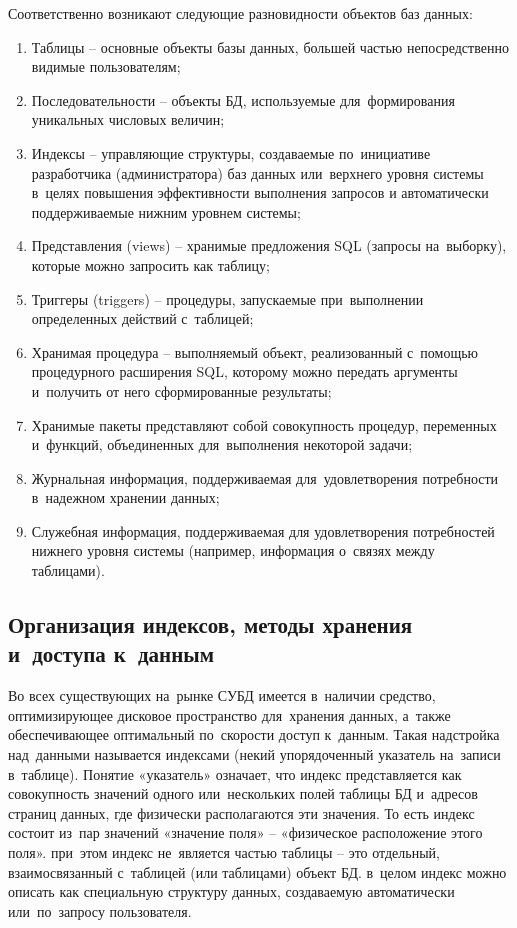 \documentclass{ou}
\begin{document}
Соответственно возникают следующие разновидности объектов баз данных:
\begin{enumerate}[itemindent=4em, nosep, label=\arabic*)]
\item Таблицы -- основные объекты базы данных, большей частью непосредственно видимые пользователям;
\item Последовательности -- объекты БД, используемые для~формирования уникальных числовых величин;
\item Индексы -- управляющие структуры, создаваемые по~инициативе разработчика (администратора) баз данных или~верхнего уровня системы в~целях повышения эффективности выполнения запросов и автоматически поддерживаемые нижним уровнем системы;
\item Представления (views) -- хранимые предложения SQL (запросы на~выборку), которые можно запросить как таблицу;
\item Триггеры (triggers) -- процедуры, запускаемые при~выполнении определенных действий с~таблицей;
\item Хранимая процедура -- выполняемый объект, реализованный с~помощью процедурного расширения SQL, которому можно передать аргументы и~получить от него сформированные результаты;
\item Хранимые пакеты представляют собой совокупность процедур, переменных и~функций, объединенных для~выполнения некоторой задачи;
\item Журнальная информация, поддерживаемая для~удовлетворения потребности в~надежном хранении данных;
\item Служебная информация, поддерживаемая для удовлетворения потребностей нижнего уровня системы (например, информация о~связях между таблицами).
\end{enumerate}
\subsection{Организация индексов, методы хранения и~доступа к~данным}
Во всех существующих на~рынке СУБД имеется в~наличии средство, оптимизирующее дисковое пространство для~хранения данных, а~также обеспечивающее оптимальный по~скорости доступ к~данным. Такая надстройка над~данными называется индексами (некий упорядоченный указатель на~записи в~таблице). Понятие «указатель» означает, что индекс представляется как совокупность значений одного или~нескольких полей таблицы БД и~адресов страниц данных, где физически располагаются эти значения. То есть индекс состоит из~пар значений «значение поля» -- «физическое расположение этого поля». при~этом индекс не~является частью таблицы -- это отдельный, взаимосвязанный с~таблицей (или таблицами) объект БД. в~целом индекс можно описать как специальную структуру данных, создаваемую автоматически или~по~запросу пользователя.
\end{document}
